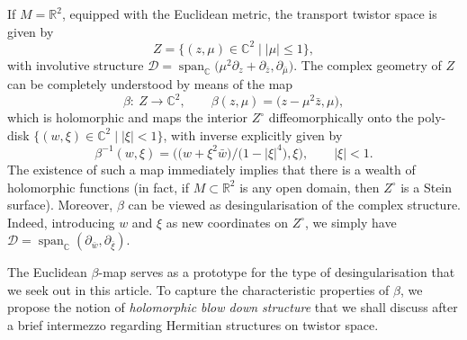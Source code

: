 \documentclass[10pt,a4paper]{amsart}
\numberwithin{equation}{section}
\theoremstyle{definition}
\newcommand{\R}{\mathbb{R}} %
\newcommand{\C}{\mathbb{C}} %
\newcommand{\1}{{\bf 1}}
\newcommand{\D}{\mathscr{D}}
\DeclareMathOperator{\spn}{span}
\begin{document}
If $M=\R^2$, equipped with the Euclidean metric, the transport twistor space is given by
\[
Z=\bigl\{(z,\mu)\in \C^2\mid |\mu|\le 1\bigr\},\]
 with involutive structure $\D =\spn_\C\bigl(\mu^2\partial_z+\partial_{\bar z},\partial_{\bar\mu}\bigr)$.
The complex geometry of $Z$ can be completely understood by means of the map
\begin{equation}\label{euclidbeta}
	\beta\colon \ Z\rightarrow \C^2,\qquad \beta(z,\mu)=\bigl(z-\mu^2\bar z,\mu\bigr),
\end{equation}
which is holomorphic and maps the interior $Z^\circ$ diffeomorphically onto the poly-disk $\big\{(w,\xi)\in\C^2\mid |\xi|<1\big\}$, with inverse explicitly given by \[%
\beta^{-1}(w,\xi)=\bigl(\bigl(w+\xi^2\bar w \bigr)/\bigl(1-|\xi|^4\bigr),\xi\bigr),\qquad |\xi|<1.
\]
The existence of such a map immediately implies that there is a wealth of holomorphic functions (in fact, if $M\subset \R^2$ is any open domain, then $Z^\circ$ is a Stein surface). Moreover, $\beta$ can be viewed as desingularisation of the complex structure. Indeed, introducing $w$ and $\xi$ as new coordinates on $Z^\circ$, we simply have $\D=\spn_\C(\partial_{\bar w},\partial_{\bar \xi})$.

The Euclidean $\beta$-map serves as a prototype for the type of desingularisation that we seek out in this article. To capture the characteristic properties of $\beta$, we propose the notion of {\it holomorphic blow down structure} that we shall discuss after a brief intermezzo regarding Hermitian structures on twistor space.
\end{document}
